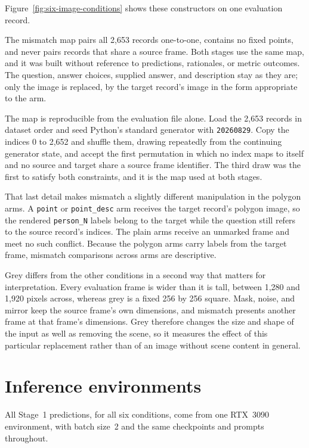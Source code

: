 Figure~\ref{fig:six-image-conditions} shows these constructors on one
evaluation record.



The mismatch map pairs all 2,653 records one-to-one, contains no fixed points,
and never pairs records that share a source frame. Both stages use the same map,
and it was built without reference to predictions, rationales, or metric
outcomes. The question, answer choices, supplied answer, and description stay as
they are; only the image is replaced, by the target record's image in the form
appropriate to the arm.

The map is reproducible from the evaluation file alone. Load the 2,653 records in
dataset order and seed Python's standard generator with \texttt{20260829}. Copy the
indices 0 to 2,652 and shuffle them, drawing repeatedly from the continuing
generator state, and accept the first permutation in which no index maps to
itself and no source and target share a source frame identifier. The third draw
was the first to satisfy both constraints, and it is the map used at both
stages.

That last detail makes mismatch a slightly different manipulation in the polygon
arms. A \texttt{point} or \texttt{point\_desc} arm receives the target record's
polygon image, so the rendered \texttt{person\_N} labels belong to the target
while the question still refers to the source record's indices. The plain arms
receive an unmarked frame and meet no such conflict. Because the polygon arms
carry labels from the target frame, mismatch comparisons across arms are
descriptive.

Grey differs from the other conditions in a second way that matters for
interpretation. Every evaluation frame is wider than it is tall, between 1,280
and 1,920 pixels across, whereas grey is a fixed 256 by 256 square. Mask, noise,
and mirror keep the source frame's own dimensions, and mismatch presents another
frame at that frame's dimensions. Grey therefore changes the size and shape of
the input as well as removing the scene, so it measures the effect of this
particular replacement rather than of an image without scene content in general.

\section{Inference environments}
\label{sec:setup-lineage}

All Stage~1 predictions, for all six conditions, come from one RTX~3090
environment, with batch size~2 and the same checkpoints and prompts throughout.

